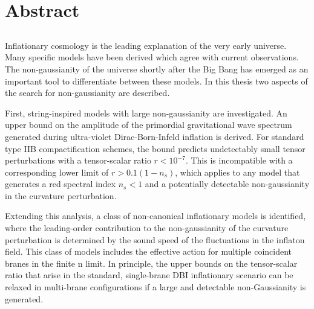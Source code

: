 \renewcommand{\CVSrevision}{\version$Id: abstract.tex,v 1.6 2009/08/15 16:54:03 ith Exp $}
% 
% 
\chapter*{Abstract}
\label{ch:abstract}
\section*{}
\singlespacing
Inflationary cosmology is the leading explanation of the very early universe. 
Many specific models have been derived which agree with current observations.
The non-gaussianity of the universe shortly after the Big Bang has emerged as
an important tool to differentiate between these models. In this thesis
two aspects of the search for non-gaussianity are described.

First, string-inspired models with large non-gaussianity are investigated.
An upper bound on the amplitude of the primordial gravitational wave spectrum
generated during ultra-violet Dirac-Born-Infeld inflation is derived. 
For standard type IIB compactification schemes, the bound predicts
undetectably small tensor perturbations with a tensor-scalar ratio $r <
10^{-7}$. 
This is incompatible with a corresponding lower limit of $r > 0.1
(1-n_s)$, which applies to any model that generates a red spectral index $n_s
<1$ and a potentially detectable non-gaussianity in the curvature perturbation.

Extending this analysis, a class of non-canonical inflationary models is
identified, where the leading-order contribution to the non-gaussianity of the
curvature perturbation is determined by the sound speed of the fluctuations in
the inflaton field. 
This class of models includes the effective action for
multiple coincident branes in the finite n limit. 
In principle, the upper bounds on the
tensor-scalar ratio that arise in the standard, single-brane DBI inflationary
scenario can be relaxed in multi-brane configurations if a large and
detectable non-Gaussianity is generated. 

